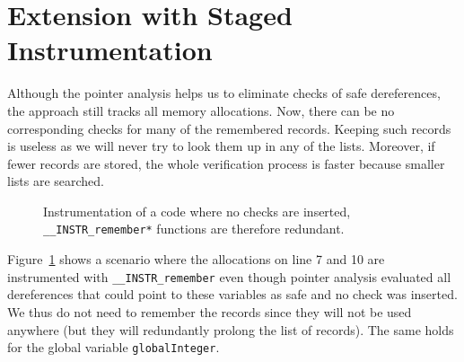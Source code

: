 \section{Extension with Staged Instrumentation}\label{sec:staged}
%
Although the pointer analysis helps us to eliminate checks of safe
dereferences, the approach still tracks all memory allocations.
Now, there can be no corresponding checks for many of the remembered records.
Keeping such records is useless as we will never try to look them up in any of the lists.
Moreover, if fewer records are stored, the whole verification process is faster
because smaller lists are searched.

\begin{figure}[t]

\caption{Instrumentation of a code where no checks are inserted, \texttt{\_\_INSTR\_remember*} functions are therefore redundant.}
\label{fig:exampleNoRemember}
\end{figure}

Figure~\ref{fig:exampleNoRemember} shows a scenario where the allocations on
line 7 and 10 are instrumented with \texttt{\_\_INSTR\_remember} even though
pointer analysis evaluated all dereferences that could point to these variables
as safe and no check was inserted. We thus do not need to remember the records
since they will not be used anywhere (but they will redundantly prolong the
list of records). The same holds for the global variable
\texttt{globalInteger}.

